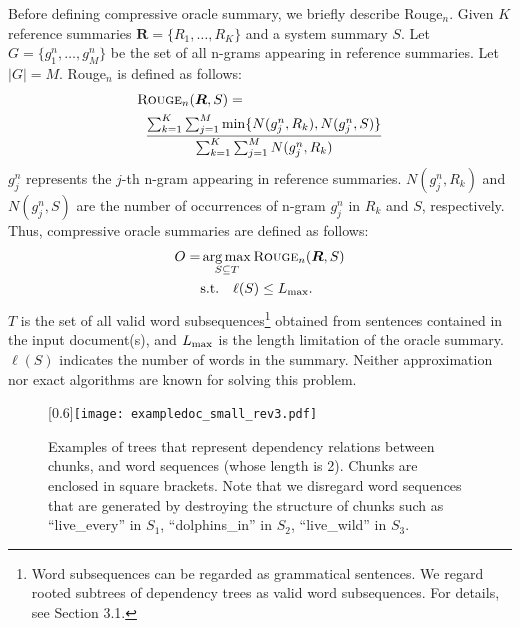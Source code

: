 \documentclass[11pt,a4paper]{article}
\DeclareMathOperator*{\argmax}{arg\,max}
\begin{document}
Before defining compressive oracle summary, we briefly describe
{\sc Rouge}$_n$. Given $K$ reference summaries
$\boldsymbol{R}{=}\{R_1,\ldots,R_K\}$ and a system summary $S$. Let $G{=}\{g_1^n,\ldots,g_M^n\}$
be the set of all n-grams appearing in reference summaries. Let $|G|{=}M$.
{\sc Rouge}$_n$ is defined as
follows:
\begin{equation}
\label{rouge}
\begin{split}
\text{\sc Rouge}_n(\boldsymbol{R},S)=&\\
&\kern-7em \frac{\sum_{k=1}^{K} \sum_{j=1}^{M} \min\{N(g_j^n,
 R_k), N(g_j^n, S)\} }{\sum_{k=1}^K\sum_{j=1}^M N(g_j^n, R_k) }
\end{split}
\end{equation}
$g_j^n$ represents the $j$-th n-gram appearing in reference summaries.
$N(g_j^n,R_k)$ and $N(g_j^n,S)$ are the number of occurrences of 
n-gram $g_j^n$ in $R_k$ and $S$, respectively.
Thus, compressive oracle summaries are defined as follows:
\begin{equation}
\label{def:oracle}
\begin{split}
O=&\argmax_{S \subseteq T} \text{\sc Rouge}_n(\boldsymbol{R},S)\\
& {\rm s.t.} ~~~\ell(S) \le L_{\rm max}.
\end{split}
\end{equation}
$T$ is the set of all valid word subsequences\footnote{
Word subsequences can be regarded as grammatical sentences.
We regard rooted subtrees of dependency trees as 
valid word subsequences.
For details, see Section 3.1.
} obtained
from sentences contained in the input document(s), and
$L_{\rm max}$
is the length limitation of the oracle summary.
 $\ell(S)$ indicates
the number of words in the summary.
Neither approximation nor exact algorithms are known for solving this problem.

\begin{figure*}[tb]
 \begin{center}
  \scalebox{0.7}[0.6]{\texttt{[image: exampledoc\_small\_rev3.pdf]}}
    \caption{Examples of trees that represent dependency relations
  between chunks, and word sequences (whose length is 2).
  Chunks are enclosed in square
    brackets.  
  Note that we disregard word sequences that are generated by destroying
  the structure of chunks such as ``live\_every'' in $S_1$, ``dolphins\_in'' in $S_2$, 
  ``live\_wild'' in $S_3$.
}
  \label{deptree}
 \end{center}
\end{figure*}
\end{document}
